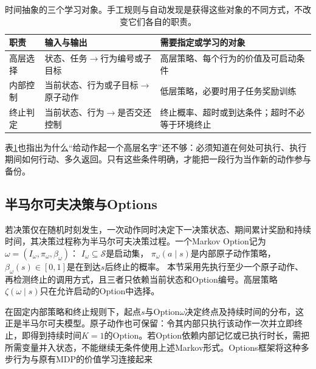 \begin{table}[t]
  \centering
  \small
  \begin{tabularx}{\linewidth}{>{\raggedright\arraybackslash}p{24mm} >{\raggedright\arraybackslash}X >{\raggedright\arraybackslash}X}
    \toprule
    职责 & 输入与输出 & 需要指定或学习的对象 \\
    \midrule
    高层选择 & 状态、任务$\to$行为编号或子目标 & 高层策略、每个行为的价值及可启动条件 \\
    内部控制 & 当前状态、行为或子目标$\to$原子动作 & 低层策略，必要时用子任务奖励训练 \\
    终止判定 & 当前状态、行为$\to$是否交还控制 & 终止概率、超时或到达条件；超时不必等于环境终止 \\
    \bottomrule
  \end{tabularx}
  \caption{时间抽象的三个学习对象。手工规则与自动发现是获得这些对象的不同方式，不改变它们各自的职责。}
  \label{tab:rl-learning-hierarchy-objects}
\end{table}

表\ref{tab:rl-learning-hierarchy-objects}也指出为什么“给动作起一个高层名字”还不够：必须知道在何处可执行、执行期间如何行动、多久返回。只有这些条件明确，才能把一段行为当作新的动作参与备份。

\subsection{半马尔可夫决策与Options}
\label{sec:rl-learning-options}

\begin{definition}
  \label{def:rl-learning-option}
  若决策仅在随机时刻发生，一次动作同时决定下一决策状态、期间累计奖励和持续时间，其决策过程称为半马尔可夫决策过程。一个Markov Option记为
  $\omega=(I_\omega,\pi_\omega,\beta_\omega)$：
  $I_\omega\subseteq\mathcal S$是启动集，
  $\pi_\omega(a\mid s)$是内部原子动作策略，
  $\beta_\omega(s)\in[0,1]$是在到达$s$后终止的概率。
  本节采用先执行至少一个原子动作、再检测终止的调用方式，且三者只依赖当前状态和Option编号。高层策略$\zeta(\omega\mid s)$只在允许启动的Option中选择。
\end{definition}

在固定内部策略和终止规则下，起点$s$与Option$\omega$决定终点及持续时间的分布，这正是半马尔可夫模型。原子动作也可保留：令其内部只执行该动作一次并立即终止，即得到持续时间$K=1$的Option。若Option依赖内部记忆或已执行时长，需把所需变量并入状态，不能继续无条件使用上述Markov形式。Options框架将这种多步行为与原有MDP的价值学习连接起来

